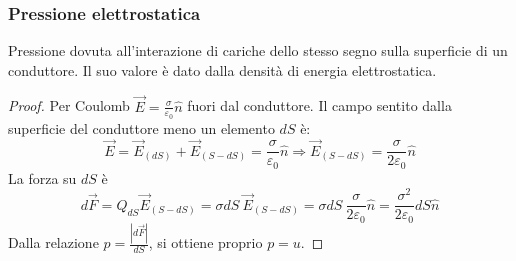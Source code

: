 \documentclass[a4paper]{scrartcl}
\numberwithin{equation}{subsection}
\theoremstyle{style1}
\newenvironment{boxenv}[1][]{
    \begin{eqbox}[#1]
    }{
   \end{eqbox}
}
\begin{document}
\subsubsection{Pressione elettrostatica}
Pressione dovuta all'interazione di cariche dello stesso segno sulla superficie di un conduttore. Il suo valore \`e dato dalla densit\`a di energia elettrostatica.
\begin{boxenv}[]
\begin{proof}
	Per Coulomb $\vec{E} = \frac{\sigma }{\varepsilon _0}\hat{n}$ fuori dal conduttore. Il campo sentito dalla superficie del conduttore meno un elemento $dS$ \`e:
	\begin{equation}
		\vec{E} = \vec{E}_{(dS)}  + \vec{E}_{(S-dS)} = \frac{\sigma}{\varepsilon _0}\hat{n} \Rightarrow \vec{E}_{(S-dS)} = \frac{\sigma }{2 \varepsilon _0} \hat{n}
	\end{equation}
	La forza su $dS$ \`e
	\begin{equation}
		d\vec{F}=Q_{dS} \vec{E}_{(S-dS)} =\sigma  dS\ \vec{E}_{(S-dS)}  = \sigma dS\ \frac{\sigma }{2\varepsilon _0}\hat{n}=\frac{\sigma ^2}{2\varepsilon _0}dS \hat{n}
	\end{equation}
	Dalla relazione $p = \frac{\left\lvert d\vec{F} \right\rvert }{dS}$, si ottiene proprio $p=u$.
\end{proof}
\end{boxenv}
\end{document}
